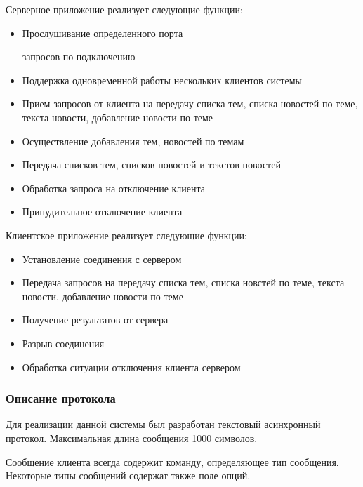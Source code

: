 Серверное приложение реализует следующие функции:
\begin{itemize}
\item Прослушивание определенного порта

 запросов по подключению

\item Поддержка одновременной работы нескольких клиентов системы

\item Прием запросов от клиента на передачу списка тем, списка новостей по теме, текста новости, добавление новости по теме

\item Осуществление добавления тем, новостей по темам

\item Передача списков тем, списков новостей и текстов новостей

\item Обработка запроса на отключение клиента

\item Принудительное отключение клиента
\end{itemize}

Клиентское приложение реализует следующие функции:

\begin{itemize}
\item Установление соединения с сервером

\item Передача запросов на передачу списка тем, списка новстей по теме, текста новости, добавление новости по теме

\item Получение результатов от сервера

\item Разрыв соединения

\item Обработка ситуации отключения клиента сервером
\end{itemize}


\subsubsection{Описание протокола}

Для реализации данной системы был разработан текстовый асинхронный протокол. Максимальная длина сообщения 1000 символов. 

Сообщение клиента всегда содержит команду, определяющее тип сообщения. Некоторые типы сообщений содержат также поле опций.

